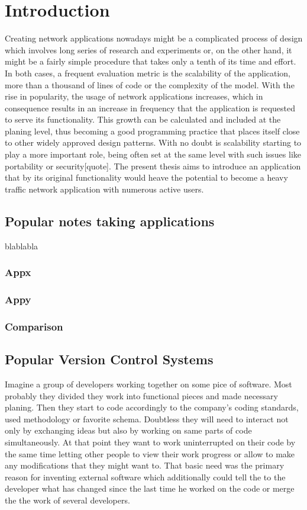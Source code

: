\chapter{Introduction}
\label{sec:Introduction}
Creating network applications nowadays might be a complicated process of design which involves long series of research and experiments or, on the other hand, it might be a fairly simple procedure that takes only a tenth of its time and effort. In both cases, a frequent evaluation metric is the scalability of the application, more than a thousand of lines of code or the complexity of the model. With the rise in popularity, the usage of network applications increases, which in consequence results in an increase in frequency that the application is requested to serve its functionality. This growth can be calculated and included at the planing level, thus becoming a good programming practice that places itself close to other widely approved design patterns. With no doubt is scalability starting to play a more important role, being often set at the same level with such issues like portability or security[quote]. The present thesis aims to introduce an application that by its original functionality would heave the potential to become a heavy traffic network application with numerous active users.

\section{Popular notes taking applications}\label{sec:popular_apps} 
blablabla
\subsection{Appx}\label{subsec:x} 
\subsection{Appy}
\subsection{Comparison}
\section{Popular Version Control Systems}\label{sec:popular_vcs}
Imagine a group of developers working together on some pice of software.  Most probably they divided they work into functional pieces and made necessary planing. Then they start to code accordingly to the company's coding standards, used methodology or favorite schema. Doubtless they will need to interact not only by exchanging ideas but also by working on same parts of code simultaneously.  At that point they want to work uninterrupted on their code by the same time letting other people to view their work progress or allow to make any modifications that they might want to. That basic need was the primary reason for inventing external software which additionally could tell the to the developer what has changed since the last time he worked on the code or merge the the work of several developers. 

